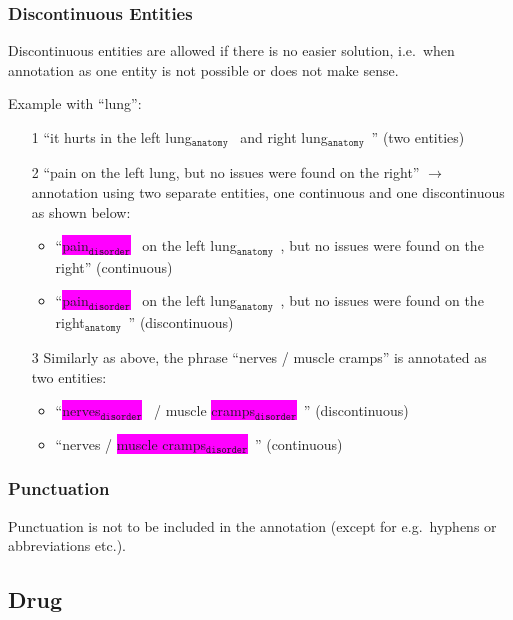\documentclass[12pt]{article}
\theoremstyle{definition}
\newcommand{\anatomy}[1]{\colorbox{dollarbill}{#1$_{\texttt{anatomy}}$}\ }
\newcommand{\disorder}[1]{\colorbox{fuchsia}{#1$_{\texttt{disorder}}$}\ }
\begin{document}
\subsubsection*{Discontinuous Entities}

Discontinuous entities are allowed if there is no easier solution, i.e.~when annotation as one entity is not possible or does not make sense.

Example with ``lung'':
\begin{enumerate}
    \item[1] ``it hurts in the \anatomy{left lung} and \anatomy{right lung}'' (two entities)
    
    \item[2] ``pain on the left lung, but no issues were found on the right'' $\rightarrow$ annotation using two separate entities, one continuous and one discontinuous as shown below:
    \begin{itemize}
        \item ``\disorder{pain} on the \anatomy{left lung}, but no issues were found on the right'' (continuous)
        \item ``\disorder{pain} on the left \anatomy{lung}, but no issues were found on the \anatomy{right}'' (discontinuous) 
    \end{itemize}

    \item[3] Similarly as above, the phrase ``nerves / muscle cramps'' is annotated as two entities:
    \begin{itemize}
        \item ``\disorder{nerves} / muscle \disorder{cramps}'' (discontinuous)
        \item ``nerves / \disorder{muscle cramps}'' (continuous)
    \end{itemize}


\end{enumerate}



\subsubsection*{Punctuation}

Punctuation is not to be included in the annotation (except for e.g.~hyphens or abbreviations etc.).


\subsection{Drug}
\end{document}
